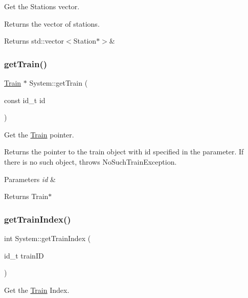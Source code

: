 Get the Stations vector. 

Returns the vector of stations.

\begin{DoxyReturn}{Returns}
std\+::vector$<$\+Station$\ast$$>$\& 
\end{DoxyReturn}
\mbox{\label{classSystem_ac29b91a9dca7dd1bb4c39769a75d444f}} 
\subsubsection{\texorpdfstring{get\+Train()}{getTrain()}}
{\footnotesize\ttfamily \mbox{\hyperlink{classTrain}{Train}} $\ast$ System\+::get\+Train (\begin{DoxyParamCaption}\item[{const id\+\_\+t}]{id }\end{DoxyParamCaption})}



Get the \mbox{\hyperlink{classTrain}{Train}} pointer. 

Returns the pointer to the train object with id specified in the parameter. If there is no such object, throws No\+Such\+Train\+Exception.


\begin{DoxyParams}{Parameters}
{\em id} & \\
\hline
\end{DoxyParams}
\begin{DoxyReturn}{Returns}
Train$\ast$ 
\end{DoxyReturn}
\mbox{\label{classSystem_a15d033a2efda45b83bbe0800698ae712}} 
\subsubsection{\texorpdfstring{get\+Train\+Index()}{getTrainIndex()}}
{\footnotesize\ttfamily int System\+::get\+Train\+Index (\begin{DoxyParamCaption}\item[{id\+\_\+t}]{train\+ID }\end{DoxyParamCaption})}



Get the \mbox{\hyperlink{classTrain}{Train}} Index. 

